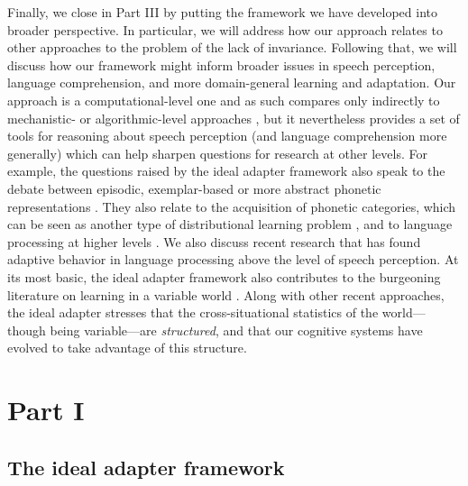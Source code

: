 Finally, we close in Part III by putting the framework we have developed into broader perspective.  In particular, we will address how our approach relates to other approaches to the problem of the lack of invariance.  Following that, we will discuss how our framework might inform broader issues in speech perception, language comprehension, and more domain-general learning and adaptation. Our approach is a computational-level one and as such compares only indirectly to mechanistic- or algorithmic-level approaches \autocite{Marr1982}, but it nevertheless provides a set of tools for reasoning about speech perception (and language comprehension more generally) which can help sharpen questions for research at other levels.  For example, the questions raised by the ideal adapter framework also speak to the debate between episodic, exemplar-based or more abstract phonetic representations \autocite{Johnson1997,Goldinger1998,McClelland1986,Norris2008,Pierrehumbert2003}. They also relate to the acquisition of phonetic categories, which can be seen as another type of distributional learning problem \autocite{Maye2002,McMurray2009,Vallabha2007}, and to language processing at higher levels \autocite[e.g.,][]{Fine2013,Grodner2011,Kamide2012,Kurumada2012,Kurumada2014}.  We also discuss recent research that has found adaptive behavior in language processing above the level of speech perception. At its most basic, the ideal adapter framework also contributes to the burgeoning literature on learning in a variable world \autocites[e.g., change detection][]{Gallistel2001}[hierarchical reinforcement learning][]{Botvinick2012}[motor learning][]{Kording2007a}.  Along with other recent approaches, the ideal adapter stresses that the cross-situational statistics of the world---though being variable---are \emph{structured}, and that our cognitive systems have evolved to take advantage of this structure.
\label{r2-outline-parts-end} 

\section{Part I}
\label{sec:part-i}

\subsection{The ideal adapter framework}
\label{sec:framework}

